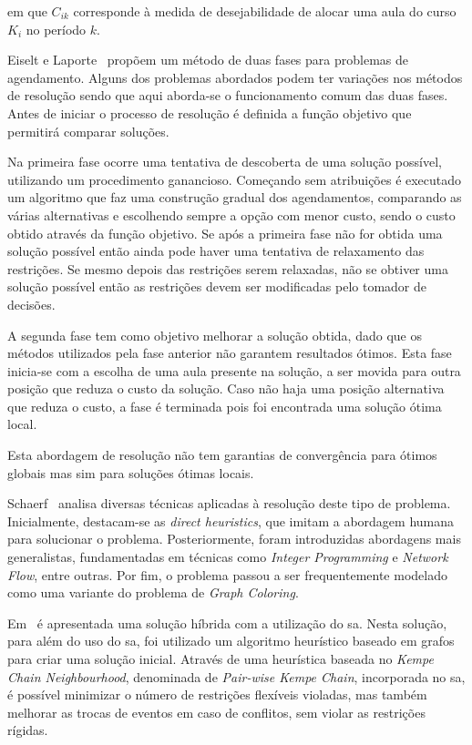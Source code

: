 em que $C_{ik}$ corresponde à medida de desejabilidade de alocar uma aula do curso $K_{i}$ no período $k$.

Eiselt e Laporte~\cite{CombinatorialOptimizationProblems-Eiselt-1987} propõem um método de duas fases para problemas de agendamento. Alguns dos problemas abordados podem ter variações nos métodos de resolução sendo que aqui aborda-se o funcionamento comum das duas fases. Antes de iniciar o processo de resolução é definida a função objetivo que permitirá comparar soluções.

Na primeira fase ocorre uma tentativa de descoberta de uma solução possível, utilizando um procedimento ganancioso. Começando sem atribuições é executado um algoritmo que faz uma construção gradual dos agendamentos, comparando as várias alternativas e escolhendo sempre a opção com menor custo, sendo o custo obtido através da função objetivo. Se após a primeira fase não for obtida uma solução possível então ainda pode haver uma tentativa de relaxamento das restrições. Se mesmo depois das restrições serem relaxadas, não se obtiver uma solução possível então as restrições devem ser modificadas pelo tomador de decisões.

A segunda fase tem como objetivo melhorar a solução obtida, dado que os métodos utilizados pela fase anterior não garantem resultados ótimos. Esta fase inicia-se com a escolha de uma aula presente na solução, a ser movida para outra posição que reduza o custo da solução. Caso não haja uma posição alternativa que reduza o custo, a fase é terminada pois foi encontrada uma solução ótima local.

Esta abordagem de resolução não tem garantias de convergência para ótimos globais mas sim para soluções ótimas locais. 

Schaerf~\cite{SurveyAutomatedTimetabling-Schaerf-1999} analisa diversas técnicas aplicadas à resolução deste tipo de problema. Inicialmente, destacam-se as \textit{direct heuristics}, que imitam a abordagem humana para solucionar o problema. Posteriormente, foram introduzidas abordagens mais generalistas, fundamentadas em técnicas como \textit{Integer Programming} e \textit{Network Flow}, entre outras. Por fim, o problema passou a ser frequentemente modelado como uma variante do problema de \textit{Graph Coloring}.

Em~\cite{HybridSimulatedAnnealing-Tuga-2007} é apresentada uma solução híbrida com a utilização do \gls{sa}. Nesta solução, para além do uso do \gls{sa}, foi utilizado um algoritmo heurístico baseado em grafos para criar uma solução inicial. Através de uma heurística baseada no \textit{Kempe Chain Neighbourhood}, denominada de \textit{Pair-wise Kempe Chain}, incorporada no \gls{sa}, é possível minimizar o número de restrições flexíveis violadas, mas também melhorar as trocas de eventos em caso de conflitos, sem violar as restrições rígidas.

